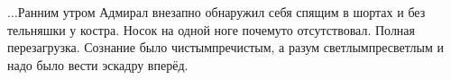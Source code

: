 

\begin{center}
\end{center}

$\ldots$Ранним утром Адмирал внезапно обнаружил себя спящим в шортах и без тельняшки у костра. Носок на одной ноге почему\sdash то отсутствовал. Полная перезагрузка. Сознание было чистым\sdash пречистым, а разум светлым\sdash пресветлым и надо было вести эскадру вперёд.

\begin{center}
\end{center}
